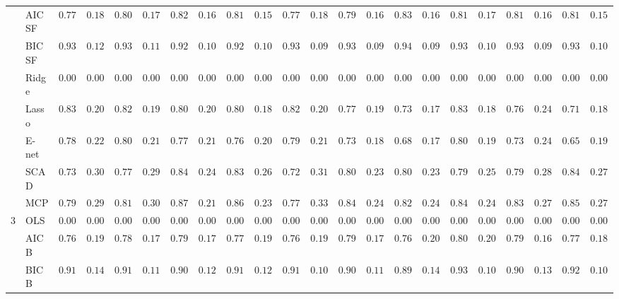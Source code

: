 \begin{tabular}{ll|ll|llllll|llllll|llllll}
 & AIC SF  & $0.7783$ & $0.1836$ & $0.8083$ & $0.1731$ & $0.8200$ & $0.1636$ & $0.8183$ & $0.1555$ & $0.7767$ & $0.1808$ & $0.7967$ & $0.1634$ & $0.8333$ & $0.1607$ & $0.8117$ & $0.1735$ & $0.8133$ & $0.1663$ & $0.8167$ & $0.1598$ \\
 & BIC SF  & $0.9333$ & $0.1231$ & $0.9333$ & $0.1136$ & $0.9233$ & $0.1044$ & $0.9267$ & $0.1094$ & $0.9333$ & $0.0977$ & $0.9383$ & $0.0967$ & $0.9483$ & $0.0908$ & $0.9300$ & $0.1090$ & $0.9367$ & $0.0999$ & $0.9367$ & $0.1054$ \\
 & Ridge  & $0.0000$ & $0.0000$ & $0.0000$ & $0.0000$ & $0.0000$ & $0.0000$ & $0.0000$ & $0.0000$ & $0.0000$ & $0.0000$ & $0.0000$ & $0.0000$ & $0.0000$ & $0.0000$ & $0.0000$ & $0.0000$ & $0.0000$ & $0.0000$ & $0.0000$ & $0.0000$ \\
 & Lasso  & $0.8317$ & $0.2072$ & $0.8283$ & $0.1946$ & $0.8067$ & $0.2075$ & $0.8050$ & $0.1881$ & $0.8250$ & $0.2084$ & $0.7717$ & $0.1991$ & $0.7367$ & $0.1776$ & $0.8367$ & $0.1804$ & $0.7683$ & $0.2403$ & $0.7117$ & $0.1878$ \\
 & E-net  & $0.7867$ & $0.2261$ & $0.8000$ & $0.2132$ & $0.7767$ & $0.2108$ & $0.7667$ & $0.2079$ & $0.7950$ & $0.2104$ & $0.7333$ & $0.1895$ & $0.6883$ & $0.1751$ & $0.8000$ & $0.1953$ & $0.7333$ & $0.2416$ & $0.6550$ & $0.1957$ \\
 & SCAD  & $0.7383$ & $0.3091$ & $0.7750$ & $0.2905$ & $0.8417$ & $0.2432$ & $0.8367$ & $0.2669$ & $0.7283$ & $0.3184$ & $0.8050$ & $0.2322$ & $0.8067$ & $0.2389$ & $0.7967$ & $0.2558$ & $0.7950$ & $0.2821$ & $0.8433$ & $0.2709$ \\
 & MCP  & $0.7967$ & $0.2955$ & $0.8133$ & $0.3055$ & $0.8783$ & $0.2130$ & $0.8600$ & $0.2342$ & $0.7700$ & $0.3331$ & $0.8450$ & $0.2499$ & $0.8233$ & $0.2460$ & $0.8483$ & $0.2405$ & $0.8333$ & $0.2773$ & $0.8533$ & $0.2714$ \\\hline
3 & OLS  & $0.0000$ & $0.0000$ & $0.0000$ & $0.0000$ & $0.0000$ & $0.0000$ & $0.0000$ & $0.0000$ & $0.0000$ & $0.0000$ & $0.0000$ & $0.0000$ & $0.0000$ & $0.0000$ & $0.0000$ & $0.0000$ & $0.0000$ & $0.0000$ & $0.0000$ & $0.0000$ \\
 & AIC B  & $0.7600$ & $0.1929$ & $0.7867$ & $0.1710$ & $0.7967$ & $0.1701$ & $0.7767$ & $0.1942$ & $0.7683$ & $0.1923$ & $0.7933$ & $0.1710$ & $0.7683$ & $0.2064$ & $0.8000$ & $0.2010$ & $0.7917$ & $0.1681$ & $0.7767$ & $0.1838$ \\
 & BIC B  & $0.9133$ & $0.1450$ & $0.9183$ & $0.1124$ & $0.9033$ & $0.1258$ & $0.9100$ & $0.1285$ & $0.9183$ & $0.1019$ & $0.9083$ & $0.1193$ & $0.8900$ & $0.1445$ & $0.9317$ & $0.1062$ & $0.9017$ & $0.1300$ & $0.9233$ & $0.1070$ \\

\end{tabular}
